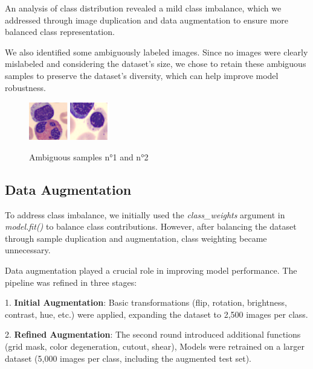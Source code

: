 \documentclass[11pt]{article}
\begin{document}
\begin{multicols}{2}
        An analysis of class distribution revealed a mild class imbalance, which we addressed through image duplication and data augmentation to ensure more balanced class representation.
        
        We also identified some ambiguously labeled images. Since no images were clearly mislabeled and considering the dataset's size, we chose to retain these ambiguous samples to preserve the dataset's diversity, which can help improve model robustness.
        
        \begin{figure}[H]
            \centering
            \includegraphics[width=0.15\textwidth]{images/ambiguous1.png}
            \includegraphics[width=0.15\textwidth]{images/ambiguous2.png}
            \caption{\small Ambiguous samples n°1 and n°2}
        \end{figure}
        
        \subsection{Data Augmentation}
        
        To address class imbalance, we initially used the \textit{class\_weights} argument in \textit{model.fit()} to balance class contributions. However, after balancing the dataset through sample duplication and augmentation, class weighting became unnecessary.
        
        Data augmentation played a crucial role in improving model performance. The pipeline was refined in three stages:
        
        1. \textbf{Initial Augmentation}: Basic transformations (flip, rotation, brightness, contrast, hue, etc.) were applied, expanding the dataset to 2,500 images per class.
        
        2. \textbf{Refined Augmentation}: The second round introduced additional functions (grid mask, color degeneration, cutout, shear), Models were retrained on a larger dataset (5,000 images per class, including the augmented test set).
        

\end{multicols}
\end{document}
